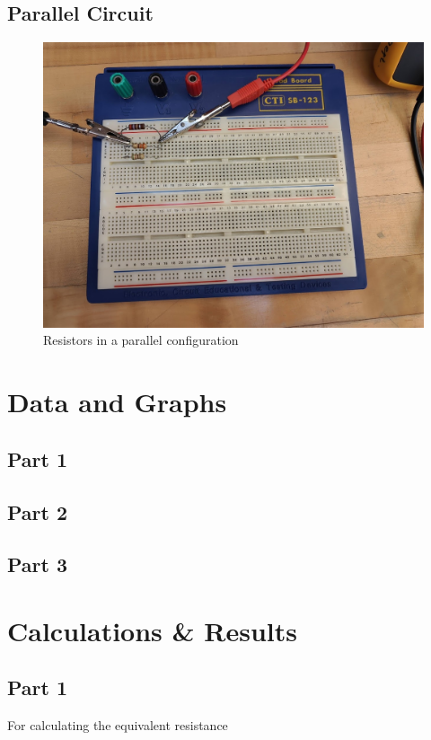 \documentclass[titlepage]{article}
\begin{document}
        \subsection{Parallel Circuit}

        \begin{figure} 
            \centering
            \caption{Resistors in a parallel configuration}
            \includegraphics[scale=0.2]{procedure/parallel} 
        \end{figure}



	\section{Data and Graphs}
	\subsection{Part 1}
	\subsection{Part 2} 
	\subsection{Part 3}
    \section{Calculations \& Results}

        \subsection{Part 1} 
    For calculating the equivalent resistance
\end{document}
